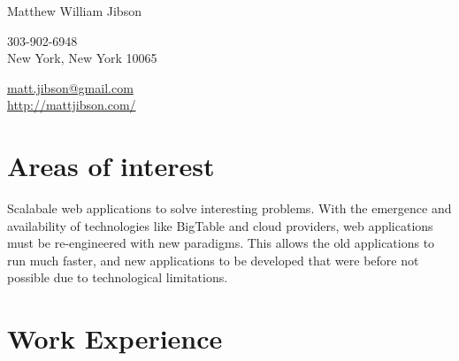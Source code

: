 \documentclass[10pt, a4paper]{article}
\begin{document}
\sloppy

\reversemarginpar
{{\huge Matthew William Jibson}\\[1.0cm]
\parbox{.5\linewidth}{
\vspace{\baselineskip}
303-902-6948\\
New York, New York 10065
}
\parbox{.5\linewidth}{
\begin{flushright}
\href{mailto:matt.jibson@gmail.com}{matt.jibson@gmail.com}\\
\href{http://mattjibson.com/}{http://mattjibson.com/}\\
\end{flushright}
}

\section*{Areas of interest}
Scalabale web applications to solve interesting problems. With the emergence and availability of technologies like BigTable and cloud providers, web applications must be re-engineered with new paradigms. This allows the old applications to run much faster, and new applications to be developed that were before not possible due to technological limitations.

\section*{Work Experience}

}
\end{document}
